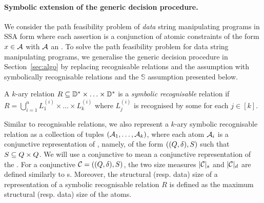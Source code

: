 

\paragraph{Symbolic extension of the generic decision procedure.} We consider the path feasibility problem of \emph{data} string manipulating programs in SSA form 
 where each assertion is a conjunction of atomic constraints of the form $x \in \mathcal{A}$ with $\mathcal{A}$ an \SA. 
To solve the path feasibility problem for data string manipulating programs,
we generalise the generic decision procedure in Section~\ref{sec:algo} by replacing recognisable relations and the \prerec{} assumption with symbolically recognisable relations and the $\mathbb{S}$\prerec{} assumption presented below.

\begin{definition}[Symbolic recognisable relations]
	A $k$-ary relation $R \subseteq \mathbb{D}^*\times \ldots\times \mathbb{D}^*$ is a \emph{symbolic recognisable} relation if $R=\bigcup_{i=1}^n L^{(i)}_1 \times \ldots \times L^{(i)}_k$ where $L^{(i)}_j$ is recognised by some \SA{} for each $j\in [k]$.
\end{definition}
Similar to recognisable relations, we also represent a  $k$-ary symbolic recognisable relation as a collection of tuples $(\mathcal{A}_1, \ldots, \mathcal{A}_k)$, where each atom $\mathcal{A}_i$ is a conjunctive representation of \SA{}, namely, of the form $((Q, \delta), S)$ such that $S \subseteq Q \times Q$. We will use a conjunctive \SA{} to mean a conjunctive representation of the \SA{}. For a conjunctive \SA{} $\mathcal{C}= ((Q, \delta), S)$, the two size measures $|\mathcal{C}|_s$ and $|\mathcal{C}|_d$ are defined similarly to \SA{}s. Moreover, the structural (resp. data) size of a representation of a symbolic recognisable relation $R$  is defined as the maximum structural (resp. data) size of the atoms.

